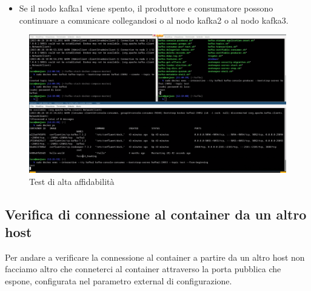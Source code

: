 \documentclass{article}
\begin{document}
\begin{itemize}
    \item Se il nodo kafka1 viene spento, il produttore e consumatore possono continuare a comunicare collegandosi o al nodo kafka2 o al nodo kafka3.
\end{itemize}
\begin{figure}[H]
    \centering
    \includegraphics[scale=0.5]{images/test_di_high_avaibility.png}
    \caption{Test di alta affidabilità}
    \label{fig:my_label}
\end{figure}
\subsection{Verifica di connessione al container da un altro host}
Per andare a verificare la connessione al container a partire da un altro host non facciamo altro che conneterci al container attraverso la porta pubblica che espone, configurata nel parametro external di configurazione.
\end{document}
